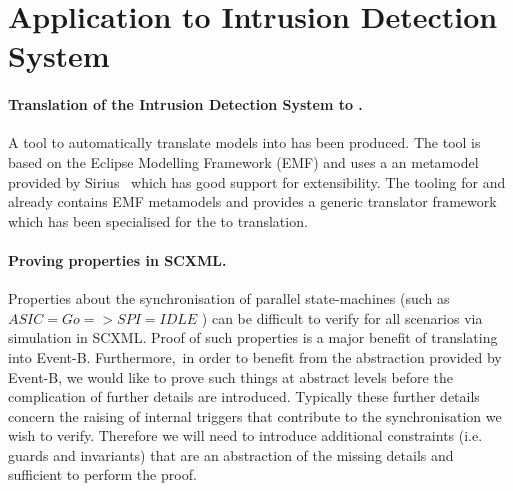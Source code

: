 
\section{Application to Intrusion Detection System}
\label{sec:example}

\paragraph{Translation of the Intrusion Detection System to \EventB.}
A tool to automatically translate \SCXML models into \iUMLB has been produced. 
The tool is based on the Eclipse Modelling Framework (EMF) and uses a an \SCXML metamodel provided by Sirius~\cite{siriuswebsite} which has good support for extensibility. 
The tooling for \iUMLB and \EventB already contains EMF metamodels and provides a generic translator framework which has been specialised for the \SCXML to \iUMLB translation. 

\paragraph{Proving properties in SCXML.}
Properties about the synchronisation of parallel state-machines (such as $ASIC=Go => SPI=IDLE$
) can be difficult to verify for all scenarios via simulation in SCXML. 
Proof of such properties is a major benefit of translating into Event-B.  
Furthermore, in order to benefit from the abstraction provided by Event-B, we would like to prove such things at abstract levels before the complication of further details are introduced. Typically these further details concern the raising of internal triggers that contribute to the synchronisation we wish to verify. Therefore we will need to introduce additional constraints (i.e. guards and invariants) that are an abstraction of the missing details and sufficient to perform the proof.

